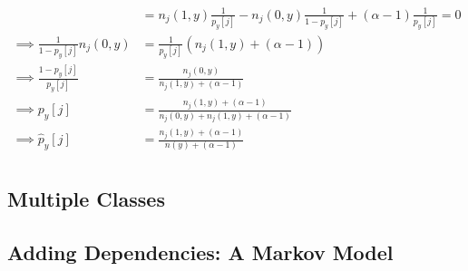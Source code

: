 \documentclass{amsart}
\theoremstyle{definition}
\begin{document}
\begin{enumerate}[(a)]
\begin{align*}
			&= n_j(1,y)\frac{1}{p_y[j]} - n_j(0,y)\frac{1}{1-p_y[j]} + (\alpha - 1)\frac{1}{p_{y}[j]} = 0\\
			\implies \frac{1}{1-p_y[j]}n_j(0,y)&= \frac{1}{p_y[j]}(n_j(1,y) + (\alpha - 1)) \\
			\implies \frac{1-p_y[j]}{p_y[j]} &= \frac{n_j(0, y)}{n_j(1, y) + (\alpha - 1)}\\
			\implies p_y[j] &= \frac{n_j(1,y) + (\alpha - 1)}{n_j(0, y) + n_j(1, y) + (\alpha - 1)}\\
			\implies \hat{p}_y[j]&= \frac{n_j(1,y) + (\alpha - 1)}{n(y) + (\alpha - 1)}\\
		\end{align*}



\end{enumerate}
\subsection{Multiple Classes}
\subsection{Adding Dependencies: A Markov Model}
\end{document}
